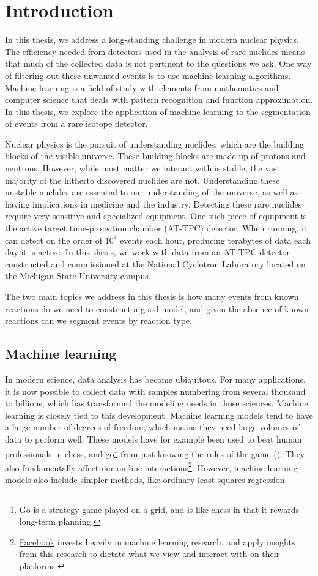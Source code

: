 \chapter{Introduction}\label{ch:introduction}


In this thesis, we address a long-standing challenge in modern nuclear physics. 
The efficiency needed from detectors used in the analysis of rare nuclides means that much of the collected data is not pertinent to the questions we ask. One way of filtering out these unwanted events is to use machine learning algorithms. Machine learning is a field of study with elements from mathematics and computer science that deals with pattern recognition and function approximation. In this thesis, we explore the application of machine learning to the segmentation of events from a rare isotope detector.

Nuclear physics is the pursuit of understanding nuclides, which are the building blocks of the visible universe. These building blocks are made up of protons and neutrons. However, while most matter we interact with is stable, the vast majority of the hitherto discovered nuclides are not. Understanding these unstable nuclides are essential to our understanding of the universe, as well as having implications in medicine and the industry. Detecting these rare nuclides require very sensitive and specialized equipment. One such piece of equipment is the active target time-projection chamber (AT-TPC) detector. When running, it can detect on the order of $10^4$ events each hour, producing terabytes of data each day it is active. In this thesis, we work with data from an AT-TPC detector constructed and commissioned at the National Cyclotron Laboratory located on the Michigan State University campus. 

The two main topics we address in this thesis is how many events from known reactions do we need to construct a good model, and given the absence of known reactions can we segment events by reaction type. 
\section{Machine learning}

In modern science, data analysis has become ubiquitous. For many applications, it is now possible to collect data with samples numbering from several thousand to billions, which has transformed the modeling needs in those sciences. Machine learning is closely tied to this development. Machine learning models tend to have a large number of degrees of freedom, which means they need large volumes of data to perform well. These models have for example been used to beat human professionals in chess, and go\footnote{Go is a strategy game played on a grid, and is like chess in that it rewards long-term planning.} from just knowing the rules of the game (\cite{Silver2017}). They also fundamentally affect our on-line interactions\footnote{\href{https://research.fb.com/category/machine-learning/}{Facebook} invests heavily in machine learning research, and apply insights from this research to dictate what we view and interact with on their platforms.}. However, machine learning models also include simpler methods, like ordinary least squares regression. 

